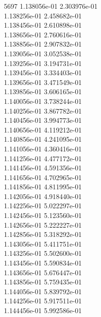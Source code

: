 5697	1.138056e-01	2.303976e-01	\\ 	1.138256e-01	2.458682e-01	\\ 	1.138456e-01	2.610898e-01	\\ 	1.138656e-01	2.760616e-01	\\ 	1.138856e-01	2.907832e-01	\\ 	1.139056e-01	3.052538e-01	\\ 	1.139256e-01	3.194731e-01	\\ 	1.139456e-01	3.334403e-01	\\ 	1.139656e-01	3.471549e-01	\\ 	1.139856e-01	3.606165e-01	\\ 	1.140056e-01	3.738244e-01	\\ 	1.140256e-01	3.867782e-01	\\ 	1.140456e-01	3.994773e-01	\\ 	1.140656e-01	4.119212e-01	\\ 	1.140856e-01	4.241095e-01	\\ 	1.141056e-01	4.360416e-01	\\ 	1.141256e-01	4.477172e-01	\\ 	1.141456e-01	4.591356e-01	\\ 	1.141656e-01	4.702965e-01	\\ 	1.141856e-01	4.811995e-01	\\ 	1.142056e-01	4.918440e-01	\\ 	1.142256e-01	5.022297e-01	\\ 	1.142456e-01	5.123560e-01	\\ 	1.142656e-01	5.222227e-01	\\ 	1.142856e-01	5.318292e-01	\\ 	1.143056e-01	5.411751e-01	\\ 	1.143256e-01	5.502600e-01	\\ 	1.143456e-01	5.590834e-01	\\ 	1.143656e-01	5.676447e-01	\\ 	1.143856e-01	5.759435e-01	\\ 	1.144056e-01	5.839792e-01	\\ 	1.144256e-01	5.917511e-01	\\ 	1.144456e-01	5.992586e-01	\\ \hline
